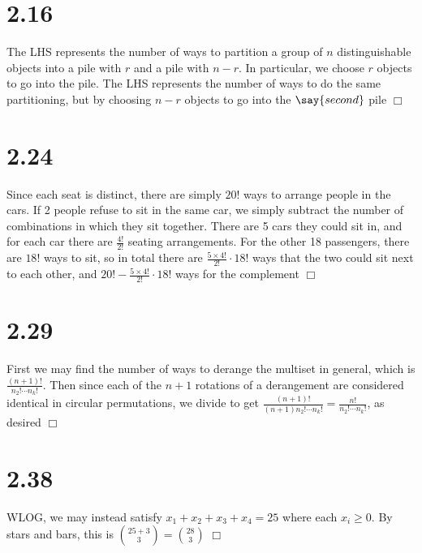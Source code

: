 \documentclass{article}
\begin{document}
\section*{2.16}
The LHS represents the number of ways to partition a group of $n$ distinguishable objects into a pile with $r$ and a pile with $n-r$. In particular, we choose $r$ objects to go into the  pile. The LHS represents the number of ways to do the same partitioning, but by choosing $n-r$ objects to go into the $\say{second}$ pile $\Box$

\section*{2.24}
Since each seat is distinct, there are simply $20!$ ways to arrange people in the cars. If 2 people refuse to sit in the same car, we simply subtract the number of combinations in which they sit together. There are 5 cars they could sit in, and for each car there are $\frac{4!}{2!}$ seating arrangements. For the other 18 passengers, there are $18!$ ways to sit, so in total there are $\frac{5 \times 4!}{2!} \cdot 18!$ ways that the two could sit next to each other, and $20! - \frac{5 \times 4!}{2!} \cdot 18!$ ways for the complement $\Box$

\section*{2.29}
First we may find the number of ways to derange the multiset in general, which is $\frac{(n+1)!}{n_2! \cdots n_k!}$. Then since each of the $n+1$ rotations of a derangement are considered identical in circular permutations, we divide to get $\frac{(n+1)!}{(n+1)n_2! \cdots n_k!} = \frac{n!}{n_2! \cdots n_k!}$, as desired $\Box$

\section*{2.38}
WLOG, we may instead satisfy $x_1 + x_2 + x_3 + x_4 = 25$ where each $x_i \geq 0$. By stars and bars, this is $\binom{25 + 3}{3} = \binom{28}{3}$ $\Box$
\end{document}
